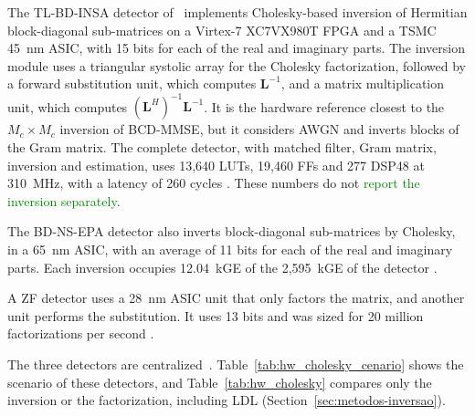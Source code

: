 The TL-BD-INSA detector of~\cite{wang2021tlbdinsa} implements Cholesky-based inversion
of Hermitian block-diagonal sub-matrices on a Virtex-7 XC7VX980T FPGA
and a TSMC 45~nm ASIC, with 15 bits for each of the real and imaginary parts. The
inversion module uses a triangular systolic array for the Cholesky
factorization, followed by a forward substitution unit, which computes $\mathbf L^{-1}$, and a matrix multiplication unit, which computes $(\mathbf L^{H})^{-1}\mathbf L^{-1}$.
It is the hardware reference closest to the $M_c \times M_c$ inversion of BCD-MMSE, but it considers AWGN and inverts blocks of the Gram matrix. The complete detector, with matched filter, Gram matrix, inversion and estimation, uses 13,640 LUTs, 19,460 FFs and 277 DSP48 at 310~MHz, with a latency of 260 cycles \cite{wang2021tlbdinsa}. These numbers do not \textcolor{GREEN}{report the inversion separately}.

The BD-NS-EPA detector also inverts block-diagonal sub-matrices by Cholesky, in a 65~nm ASIC, with an average of 11 bits for each of the real and imaginary parts. Each inversion occupies 12.04~kGE of the 2,595~kGE of the detector \cite{wang2023bdnsepa}.

A ZF detector uses a 28~nm ASIC unit that only factors the matrix, and another unit performs the substitution. It uses 13 bits and was sized for 20 million factorizations per second \cite{gangarajaiah2017cholesky}.

The three detectors are centralized~\cite{wang2021tlbdinsa,wang2023bdnsepa,gangarajaiah2017cholesky}.
Table~\ref{tab:hw_cholesky_cenario} shows the scenario of these detectors, and Table~\ref{tab:hw_cholesky} compares only the inversion or the factorization, including LDL (Section~\ref{sec:metodos-inversao}).

